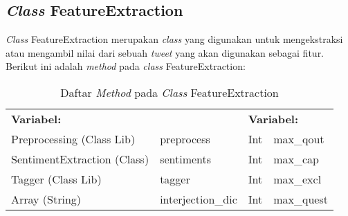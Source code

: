 \subsection{\textit{Class} FeatureExtraction}
\textit{Class }FeatureExtraction merupakan \textit{class }yang digunakan untuk mengekstraksi atau mengambil nilai dari sebuah \textit{tweet} yang akan digunakan sebagai fitur. Berikut ini adalah \textit{method} pada \textit{class }FeatureExtraction:
\begin{table}[H]
	\caption{Daftar \textit{Method} pada \textit{Class} FeatureExtraction}
	\centering
	\small
	\begin{adjustbox}{width=1\textwidth}		
	\begin{tabular}{|p{5cm} p{3.1cm} p{1cm} p{3.1cm}|}
		\hline
		\multicolumn{2}{|l}{\textbf{Variabel:}}&\multicolumn{2}{l|}{\textbf{Variabel:}}\\
		Preprocessing (Class Lib)&preprocess&Int&max\_qout\\
		SentimentExtraction (Class)&sentiments&Int&max\_cap\\
		Tagger (Class Lib)&tagger&Int&max\_excl\\
		Array (String)&interjection\_dic&Int&max\_quest\\
		\hline
	\end{tabular}
	\end{adjustbox}
\end{table}
